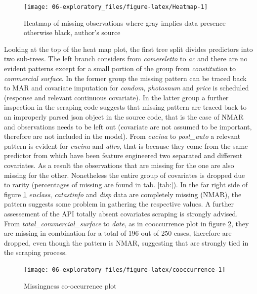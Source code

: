 \documentclass[
  12pt,
  a4paper,
  oneside]{book}
\theoremstyle{definition}
\theoremstyle{definition}
\theoremstyle{definition}
\theoremstyle{remark}
\begin{document}
\begin{figure}

{\centering \texttt{[image: 06-exploratory\_files/figure-latex/Heatmap-1]} 

}

\caption{Heatmap of missing observations where gray implies data presence otherwise black, author's source}\label{fig:Heatmap}
\end{figure}

Looking at the top of the heat map plot, the first tree split divides predictors into two sub-trees. The left branch considers from \emph{camereletto} to \emph{ac} and there are no evident patterns except for a small portion of the group from \emph{constitution} to \emph{commercial surface}. In the former group the missing pattern can be traced back to MAR and covariate imputation for \emph{condom}, \emph{photosnum} and \emph{price} is scheduled (response and relevant continuous covariate). In the latter group a further inspection in the scraping code suggests that missing pattern are traced back to an improperly parsed json object in the source code, that is the case of NMAR and observations needs to be left out (covariate are not assumed to be important, therefore are not included in the model). From \emph{cucina} to \emph{post\_auto} a relevant pattern is evident for \emph{cucina} and \emph{altro}, that is because they come from the same predictor from which have been feature engineered two separated and different covariates. As a result the observations that are missing for the one are also missing for the other. Nonetheless the entire group of covariates is dropped due to rarity (percentages of missing are found in tab. \ref{tab:}).
In the far right side of figure \ref{fig:Heatmap} \emph{enclass}, \emph{catastinfo} and \emph{disp} data are completely missing (NMAR), the pattern suggests some problem in gathering the respective values. A further assessement of the API totally absent covariates scraping is strongly advised. From \emph{total\_commercial\_surface} to \emph{date}, as in cooccurrence plot in figure \ref{fig:cooccurrence}, they are missing in combination for a total of 196 out of 250 cases, therefore are dropped, even though the pattern is NMAR, suggesting that are strongly tied in the scraping process.

\begin{figure}

{\centering \texttt{[image: 06-exploratory\_files/figure-latex/cooccurrence-1]} 

}

\caption{Missingness co-occurrence plot}\label{fig:cooccurrence}
\end{figure}
\end{document}

